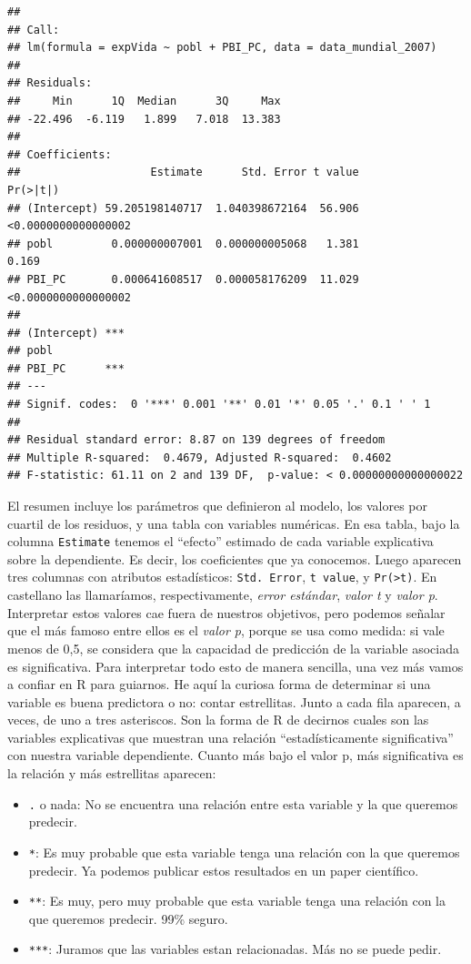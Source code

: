 \documentclass[spanish,]{book}
\providecommand{\tightlist}{%
  \setlength{\itemsep}{0pt}\setlength{\parskip}{0pt}}
\begin{document}
\begin{verbatim}
## 
## Call:
## lm(formula = expVida ~ pobl + PBI_PC, data = data_mundial_2007)
## 
## Residuals:
##     Min      1Q  Median      3Q     Max 
## -22.496  -6.119   1.899   7.018  13.383 
## 
## Coefficients:
##                    Estimate      Std. Error t value            Pr(>|t|)
## (Intercept) 59.205198140717  1.040398672164  56.906 <0.0000000000000002
## pobl         0.000000007001  0.000000005068   1.381               0.169
## PBI_PC       0.000641608517  0.000058176209  11.029 <0.0000000000000002
##                
## (Intercept) ***
## pobl           
## PBI_PC      ***
## ---
## Signif. codes:  0 '***' 0.001 '**' 0.01 '*' 0.05 '.' 0.1 ' ' 1
## 
## Residual standard error: 8.87 on 139 degrees of freedom
## Multiple R-squared:  0.4679, Adjusted R-squared:  0.4602 
## F-statistic: 61.11 on 2 and 139 DF,  p-value: < 0.00000000000000022
\end{verbatim}

El resumen incluye los parámetros que definieron al modelo, los valores por cuartil de los residuos, y una tabla con variables numéricas. En esa tabla, bajo la columna \texttt{Estimate} tenemos el ``efecto'' estimado de cada variable explicativa sobre la dependiente. Es decir, los coeficientes que ya conocemos. Luego aparecen tres columnas con atributos estadísticos: \texttt{Std.\ Error}, \texttt{t\ value}, y \texttt{Pr(\textgreater{}\textbar{}t\textbar{})}. En castellano las llamaríamos, respectivamente, \emph{error estándar}, \emph{valor t} y \emph{valor p}. Interpretar estos valores cae fuera de nuestros objetivos, pero podemos señalar que el más famoso entre ellos es el \emph{valor p}, porque se usa como medida: si vale menos de 0,5, se considera que la capacidad de predicción de la variable asociada es significativa. Para interpretar todo esto de manera sencilla, una vez más vamos a confiar en R para guiarnos. He aquí la curiosa forma de determinar si una variable es buena predictora o no: contar estrellitas. Junto a cada fila aparecen, a veces, de uno a tres asteriscos. Son la forma de R de decirnos cuales son las variables explicativas que muestran una relación ``estadísticamente significativa'' con nuestra variable dependiente. Cuanto más bajo el valor p, más significativa es la relación y más estrellitas aparecen:

\begin{itemize}
\tightlist
\item
  \texttt{.} o nada: No se encuentra una relación entre esta variable y la que queremos predecir.
\item
  \texttt{*}: Es muy probable que esta variable tenga una relación con la que queremos predecir. Ya podemos publicar estos resultados en un paper científico.
\item
  \texttt{**}: Es muy, pero muy probable que esta variable tenga una relación con la que queremos predecir. 99\% seguro.
\item
  \texttt{***}: Juramos que las variables estan relacionadas. Más no se puede pedir.
\end{itemize}
\end{document}
